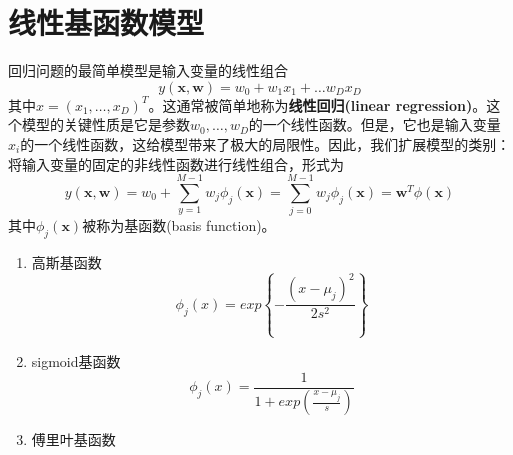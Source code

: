 \section{线性基函数模型}
回归问题的最简单模型是输入变量的线性组合
$$
y(\boldsymbol{x,w})=w_0+w_1x_1 + \dots w_Dx_D
$$
其中$x=(x_1,\dots,x_D)^T$。这通常被简单地称为\textbf{线性回归(linear regression)}。这个模型的关键性质是它是参数$w_0,\dots,w_D$的一个线性函数。但是，它也是输入变量$x_i$的一个线性函数，这给模型带来了极大的局限性。因此，我们扩展模型的类别：将输入变量的固定的非线性函数进行线性组合，形式为
$$
y(\boldsymbol{x,w})=w_0+\sum_{y=1}^{M-1}w_j\phi_j(\boldsymbol{x})=\sum_{j=0}^{M-1}w_j\phi_j(\boldsymbol{x})=\boldsymbol{w}^T\phi(\boldsymbol{x})
$$
其中$\phi_j(\boldsymbol{x})$被称为基函数(basis function)。
\begin{enumerate}
	\item 高斯基函数 
	$$
	\phi_j(x)=exp\left\{-\frac{(x-\mu_j)^2}{2s^2}\right\}
	$$
	\item sigmoid基函数 
	$$
	\phi_j(x)=\frac{1}{1+exp\left(\frac{x-\mu_j}{s}\right)}
	$$
	\item 傅里叶基函数
\end{enumerate}
